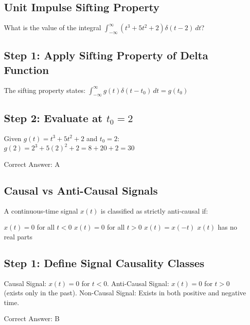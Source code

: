 \clearpage

\subsection{Unit Impulse Sifting Property}

What is the value of the integral $\int_{-\infty}^{\infty} (t^3 + 5t^2 + 2) \delta(t - 2)\, dt$?

\begin{choices}
\end{choices}

\begin{solution}

\subsection*{Step 1: Apply Sifting Property of Delta Function}
The sifting property states:
$\int_{-\infty}^{\infty} g(t) \delta(t - t_0)\, dt = g(t_0)$

\subsection*{Step 2: Evaluate at $t_0 = 2$}
Given $g(t) = t^3 + 5t^2 + 2$ and $t_0 = 2$:
$g(2) = 2^3 + 5(2)^2 + 2 = 8 + 20 + 2 = 30$

Correct Answer: A
\end{solution}

\clearpage

\subsection{Causal vs Anti-Causal Signals}

A continuous-time signal $x(t)$ is classified as strictly anti-causal if:

\begin{choices}
    \choice $x(t) = 0$ for all $t < 0$
    \correctchoice $x(t) = 0$ for all $t > 0$
    \choice $x(t) = x(-t)$
    \choice $x(t)$ has no real parts
\end{choices}

\begin{solution}

\subsection*{Step 1: Define Signal Causality Classes}
Causal Signal: $x(t) = 0$ for $t < 0$.
Anti-Causal Signal: $x(t) = 0$ for $t > 0$ (exists only in the past).
Non-Causal Signal: Exists in both positive and negative time.

Correct Answer: B
\end{solution}

